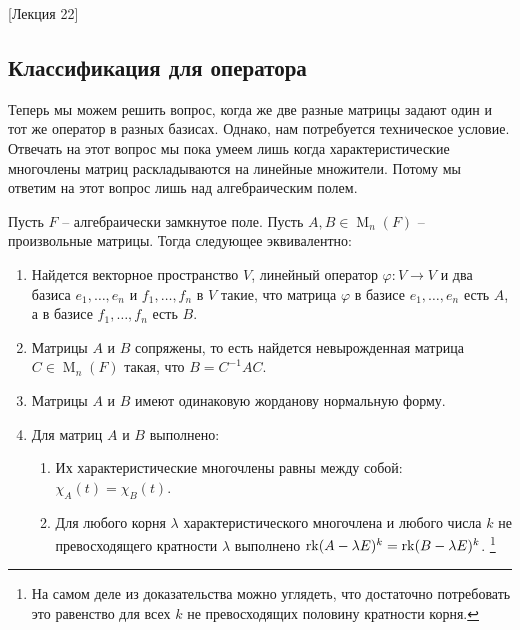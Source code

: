 [Лекция 22]


\subsection{Классификация для оператора}

Теперь мы можем решить вопрос, когда же две разные матрицы задают один и тот же оператор в разных базисах.
Однако, нам потребуется техническое условие.
Отвечать на этот вопрос мы пока умеем лишь когда характеристические многочлены матриц раскладываются на линейные множители.
Потому мы ответим на этот вопрос лишь над алгебраическим полем.

\begin{claim}
Пусть $F$ -- алгебраически замкнутое поле.
Пусть $A, B \in \operatorname{M}_n(F)$ -- произвольные матрицы.
Тогда следующее эквивалентно:
\begin{enumerate}
\item Найдется векторное пространство $V$, линейный оператор $\varphi\colon V\to V$ и два базиса $e_1,\ldots,e_n$ и $f_1,\ldots,f_n$ в $V$ такие, что матрица $\varphi$ в базисе $e_1,\ldots,e_n$ есть $A$, а в базисе $f_1,\ldots,f_n$ есть $B$.

\item Матрицы $A$ и $B$ сопряжены, то есть найдется невырожденная матрица $C\in \operatorname{M}_n(F)$ такая, что $B = C^{-1} A C$.

\item Матрицы $A$ и $B$ имеют одинаковую жорданову нормальную форму.

\item Для матриц $A$ и $B$ выполнено:
\begin{enumerate}
\item Их характеристические многочлены равны между собой: $\chi_A(t) = \chi_B(t)$.

\item Для любого корня $\lambda$ характеристического многочлена и любого числа $k$ не превосходящего кратности $\lambda$ выполнено $\operatorname{rk} (A - \lambda E)^k = \operatorname{rk} (B - \lambda E)^k$.%
\footnote{На самом деле из доказательства можно углядеть, что достаточно потребовать это равенство для всех $k$ не превосходящих половину кратности корня.}
\end{enumerate}
\end{enumerate}
\end{claim}
